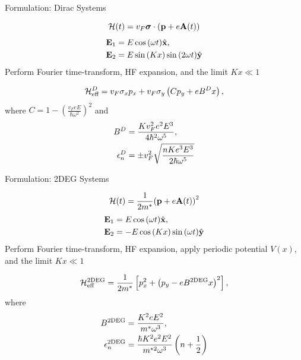 \documentclass[xcolor=dvipsnames,10pt,aspectratio=169]{beamer}
\let\oldhat\hat
\renewcommand{\hat}[1]{\oldhat{\mathbf{#1}}}
\renewcommand{\vec}[1]{\mathbf{#1}}
\newcommand{\ham}{\mathcal{H}}
\newcommand{\FO}{Formulation}
\begin{document}
  \begin{frame}{\FO: Dirac Systems}

    \begin{equation}
      \small
      \ham (t) = v_F \bm{\sigma} \cdot \left(\vec{p} + e \vec{A}(t)\right)
    \end{equation}
    \begin{align}
      \small
      \vec{E}_1 &= E\cos{(\omega t)} \hat{x}, \nonumber \\
      \vec{E}_2 &= E\sin{(Kx)}\sin{(2\omega t)} \hat{y}
    \end{align}
    Perform Fourier time-transform, HF expansion, and the limit $Kx\ll1$

    \begin{equation}
      \small
      \ham_{\text{eff}}^{D} = v_F \sigma_x p_x + v_F \sigma_y \left( C p_y + eB^Dx \right),
    \end{equation}
    where $C = 1 - {\left(\tfrac{v_F eE}{\hbar \omega^2}\right)}^2$ and
    \begin{align}
      \small
      B^{D} &= \frac{K v_F^2 e^2 E^3}{4\hbar^2 \omega^5}, \\
      \epsilon_n^{D} &= \pm v_F^2 \sqrt{ \dfrac{n K e^3 E^3}{2 \hbar \omega^5} }
    \end{align}


  \end{frame}

  \begin{frame}{\FO: 2DEG Systems}

    \begin{equation}
      \small
      \ham (t) = \dfrac{1}{2m^*} {\left( \vec{p} +e \vec{A}(t)\right)}^2
    \end{equation}
    \begin{align}
      \small
      \vec{E}_1 &= E\cos{(\omega t)} \hat{x},\nonumber \\
      \vec{E}_2 &= -E\cos{(Kx)}\sin{(\omega t)} \hat{y}
    \end{align}
    Perform Fourier time-transform, HF expansion, apply periodic potential $V(x)$, and the limit $Kx\ll1$

    \begin{equation}
      \small
      \ham_{\text{eff}}^{\text{2DEG}} = \frac{1}{2m^*} \left[ p_x^2 + {\left(p_y - eB^{\text{2DEG}}x \right)}^2\right],
    \end{equation}
    where
    \begin{align}
      \small
      B^{\text{2DEG}} &= \frac{K^2 e E^2}{m^* \omega^3}, \\
      \epsilon_n^{\text{2DEG}} &= \dfrac{\hbar K^2 e^2 E^2}{m^{*2} \omega^3} \left( n+ \dfrac{1}{2}\right)
    \end{align}

  \end{frame}
\end{document}
